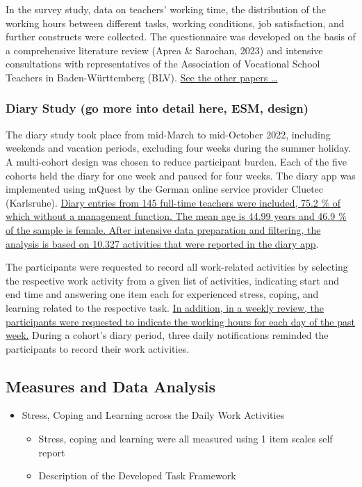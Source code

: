 \documentclass[
]{article}
\providecommand{\tightlist}{%
  \setlength{\itemsep}{0pt}\setlength{\parskip}{0pt}}
\begin{document}
In the survey study, data on teachers' working time, the distribution of
the working hours between different tasks, working conditions, job
satisfaction, and further constructs were collected. The questionnaire
was developed on the basis of a comprehensive literature review (Aprea
\& Sarochan, 2023) and intensive consultations with representatives of
the Association of Vocational School Teachers in Baden-Württemberg
(BLV). \ul{See the other papers \ldots{}}

\subsubsection{Diary Study (go more into detail here, ESM,
design)}\label{diary-study-go-more-into-detail-here-esm-design}

The diary study took place from mid-March to mid-October 2022, including
weekends and vacation periods, excluding four weeks during the summer
holiday. A multi-cohort design was chosen to reduce participant burden.
Each of the five cohorts held the diary for one week and paused for four
weeks. The diary app was implemented using mQuest by the German online
service provider Cluetec (Karlsruhe). \ul{Diary entries from 145
full-time teachers were included, 75.2 \% of which without a management
function. The mean age is 44.99 years and 46.9 \% of the sample is
female. After intensive data preparation and filtering, the analysis is
based on 10.327 activities that were reported in the diary app}.

The participants were requested to record all work-related activities by
selecting the respective work activity from a given list of activities,
indicating start and end time and answering one item each for
experienced stress, coping, and learning related to the respective task.
\ul{In addition, in a weekly review, the participants were requested to
indicate the working hours for each day of the past week.} During a
cohort's diary period, three daily notifications reminded the
participants to record their work activities.

\subsection{Measures and Data
Analysis}\label{measures-and-data-analysis}

\begin{itemize}
\tightlist
\item
  Stress, Coping and Learning across the Daily Work Activities

  \begin{itemize}
  \tightlist
  \item
    Stress, coping and learning were all measured using 1 item scales
    self report
  \item
    Description of the Developed Task Framework
  \end{itemize}
\end{itemize}
\end{document}
